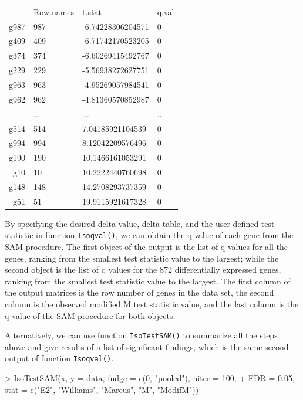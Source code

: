 \documentclass[10pt]{article}
\begin{document}
\begin{table}[!h]
\begin{left}
\begin{tabular}{rlll}
  & Row.names & t.stat & q.val \\ 
 g987 & 987 & -6.74228306204571 & 0 \\ 
  g409 & 409 & -6.71742170523205 & 0 \\ 
  g374 & 374 & -6.60269415492767 & 0 \\ 
  g229 & 229 & -5.56938272627751 & 0 \\ 
  g963 & 963 & -4.95269057984541 & 0 \\ 
  g962 & 962 & -4.81360570852987 & 0 \\ 
   & ... & ... & ... \\ 
  g514 & 514 & 7.04185921104539 & 0 \\ 
  g994 & 994 & 8.12042209576496 & 0 \\ 
  g190 & 190 & 10.1466161053291 & 0 \\ 
  g10 & 10 & 10.2222440760698 & 0 \\ 
  g148 & 148 & 14.2708293737359 & 0 \\ 
  g51 & 51 & 19.9115921617328 & 0 \\ 
  \end{tabular}
\end{left}
\end{table}
By specifying the desired delta value, delta table, and the user-defined test statistic in function \texttt{Isoqval()}, we can obtain
the q value of each gene from the SAM procedure. The first object of the output is the list of q values for
all the genes, ranking from the smallest test statistic value to the largest; while the second object is the list of q values
for the 872 differentially expressed genes, ranking from the smallest test statistic value to the largest. The first column of the output matrices is the row number of genes in
the data set, the second column is the observed modified M test statistic value, and the last column is the q value of the
SAM procedure for both objects.

Alternatively, we can use function \texttt{IsoTestSAM()} to summarize all the steps above and give results of a list of significant findings, which is the same second output of function \texttt{Isoqval()}.

\begin{Schunk}
\begin{Sinput}
> IsoTestSAM(x, y = data, fudge = c(0, "pooled"), niter = 100, 
+     FDR = 0.05, stat = c("E2", "Williams", "Marcus", "M", "ModifM"))
\end{Sinput}
\end{Schunk}
\end{document}
